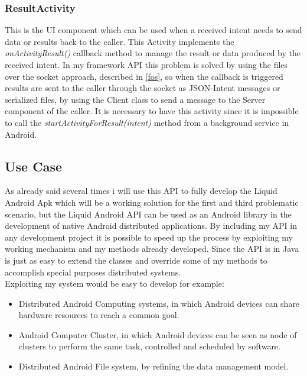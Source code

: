 \subsubsection{ResultActivity}
This is the UI component which can be used when a received intent needs to send data or results back to the caller. This Activity implements the \textit{onActivityResult()} callback method to manage the result or data produced by the received intent. In my framework API this problem is solved by using the files over the socket approach, described in \ref{fos}, so when the callback is triggered results are sent to the caller through the socket as JSON-Intent messages or serialized files, by using the Client class to send a message to the Server component of the caller. It is necessary to have this activity since it is impossible to call the \textit{startActivityForResult(intent)} method from a background service in Android.

\subsection{Use Case}
As already said several times i will use this API to fully develop the Liquid Android Apk which will be a working solution for the first and third problematic scenario, but the Liquid Android API can be used as an Android library in the development of native Android distributed applications. By including my API in any development project it is possible to speed up the process by exploiting my working mechanism and my methods already developed. Since the API is in Java is just as easy to extend the classes and override some of my methods to accomplish special purposes distributed systems.\\
Exploiting my system would be easy to develop for example:
\begin{itemize}
	\item Distributed Android Computing systems, in which Android devices can share hardware resources to reach a common goal.
	\item Android Computer Cluster, in which Android devices can be seen as node of clusters to perform the same task, controlled and scheduled by software.
	\item Distributed Android File system, by refining the data management model.
\end{itemize}


%
